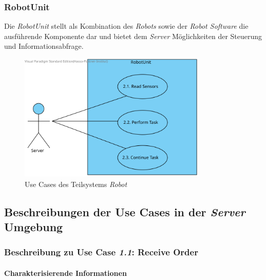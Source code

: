			\subsubsection{RobotUnit}
			Die \emph{RobotUnit} stellt als Kombination des \emph{Robots} sowie der \emph{Robot Software} die ausführende Komponente dar und bietet dem \emph{Server} Möglichkeiten der Steuerung und Informationsabfrage.
				\begin{figure}[H]
					\centering
					\includegraphics[width=0.8\textwidth]{img/2-Analyse-RobotUnit}
					\caption{Use Cases des Teilsystems \emph{Robot}}
					\label{fig:3-1-use-cases-robot-unit}
				\end{figure}

		\pagebreak

		\subsection{Beschreibungen der Use Cases in der \emph{Server} Umgebung}
			\subsubsection{Beschreibung zu Use Case \emph{1.1}: Receive Order}
			\paragraph*{Charakterisierende Informationen}

